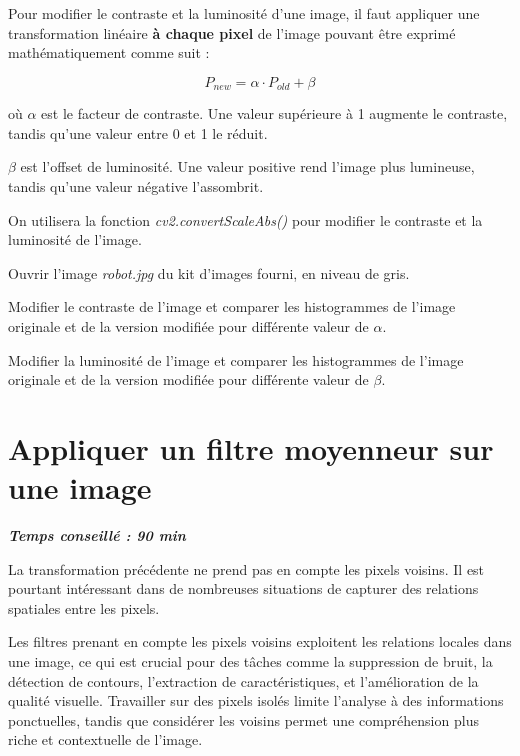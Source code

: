 \documentclass[a4paper,11pt,titlepage]{article} %
\begin{document}
Pour modifier le contraste et la luminosité d'une image, il faut appliquer une transformation linéaire \textbf{à chaque pixel} de l'image pouvant être exprimé mathématiquement comme suit :

$$P_{new} = \alpha \cdot P_{old} + \beta$$

où $\alpha$ est le facteur de contraste. Une valeur supérieure à 1 augmente le contraste, tandis qu'une valeur entre 0 et 1 le réduit.

$\beta$ est l'offset de luminosité. Une valeur positive rend l'image plus lumineuse, tandis qu'une valeur négative l'assombrit.

\medskip

On utilisera la fonction \textsl{cv2.convertScaleAbs()} pour modifier le contraste et la luminosité de l'image.

\bigskip

\Manip Ouvrir l'image \textsl{robot.jpg} du kit d'images fourni, en niveau de gris.

\Manip Modifier le contraste de l'image et comparer les histogrammes de l'image originale et de la version modifiée pour différente valeur de $\alpha$.

\Manip Modifier la luminosité de l'image et comparer les histogrammes de l'image originale et de la version modifiée pour différente valeur de $\beta$.


\section{Appliquer un filtre moyenneur sur une image}

\begin{center} \textbf{\textit{Temps conseillé : 90 min}} \end{center}

La transformation précédente ne prend pas en compte les pixels voisins. Il est pourtant intéressant dans de nombreuses situations de capturer des relations spatiales entre les pixels.

Les filtres prenant en compte les pixels voisins exploitent les relations locales dans une image, ce qui est crucial pour des tâches comme la suppression de bruit, la détection de contours, l'extraction de caractéristiques, et l'amélioration de la qualité visuelle. Travailler sur des pixels isolés limite l'analyse à des informations ponctuelles, tandis que considérer les voisins permet une compréhension plus riche et contextuelle de l'image.
\end{document}
